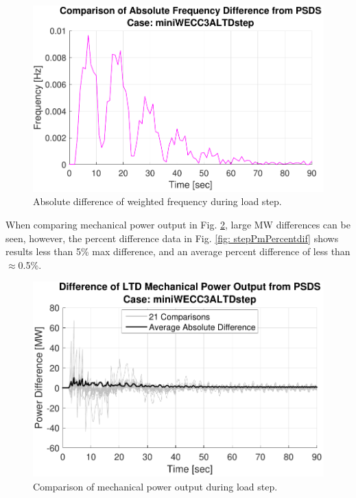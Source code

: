 \begin{figure}[!t]
	\centering
	\includegraphics[width=\linewidth]{figures/miniWECC3ALTDstepRelF}
	\caption{Absolute difference of weighted frequency during load step.}
	\label{fig: stepFdif}
\end{figure}

When comparing mechanical power output in Fig. \ref{fig: stepPmdif}, large MW differences can be seen, however, the percent difference data in Fig. \ref{fig: stepPmPercentdif} shows results less than 5\% max difference, and an average percent difference of less than $\approx$0.5\%.

\begin{figure}[!ht]
	\centering
	\includegraphics[width=\linewidth]{figures/miniWECC3ALTDstepPm2}
	\caption{Comparison of mechanical power output during load step.}
	\label{fig: stepPmdif}
\end{figure}

